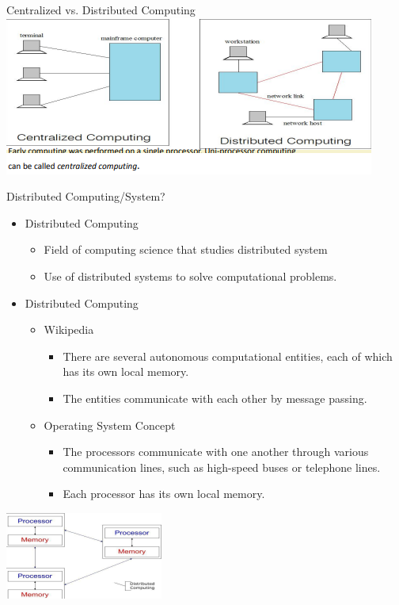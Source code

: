 \documentclass{SKP-beamer}
\begin{document}
\begin{frame}{Centralized vs. Distributed Computing}
\includegraphics[scale=1.2]{1.png}
\end{frame}


\begin{frame}{Distributed Computing/System?}
	\begin{itemize}
		\item Distributed Computing
		\begin{itemize}
			\item  Field of computing science that studies distributed system
			\item Use of distributed systems to solve computational problems.		
		\end{itemize}
		\item Distributed Computing
		\begin{itemize}
			\item Wikipedia
			
			\begin{itemize}
				\item  There are several autonomous computational entities, 
				each of which has its own local memory.
				\item The entities communicate with each other by message 
				passing.		
			\end{itemize}		
			
			\item Operating System Concept
				\begin{itemize}
				\item The processors communicate with one another through various 
				communication lines, such as high-speed buses or telephone 
				lines.
				\item Each processor has its own local memory.		
			\end{itemize}
		\end{itemize}
		
		
	\end{itemize}
	
	\includegraphics[scale=1.2]{2.png}
	
\end{frame}
\end{document}
